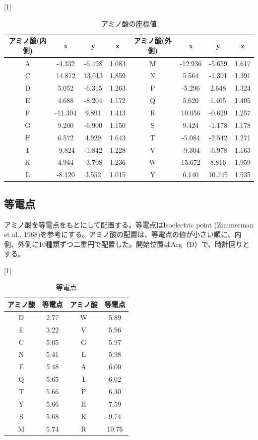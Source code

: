 \documentclass[a4paper,12pt]{jsreport}
\begin{document}
\begin{table}[H]
\centering
\caption{アミノ酸の座標値}
\scalebox{1}[1]{
\begin{tabular}{|cccc|cccc|} \hline
アミノ酸(内側) & x & y & z & アミノ酸(外側) & x & y & z \\ \hline
A & -4.332 & -6.498 & 1.083 & M & -12.936 & -5.659 & 1.617 \\[-2mm]
C & 14.872 & 13.013 & 1.859 & N & 5.564 & -1.391 & 1.391 \\[-2mm]
D & 5.052 & -6.315 & 1.263 & P & -5.296 & 2.648 & 1.324 \\[-2mm]
E & 4.688 & -8.204 & 1.172 & Q & 5.620 & 1.405 & 1.405 \\[-2mm]
F & -11.304 & 9.891 & 1.413 & R & 10.056 & -0.629 & 1.257 \\[-2mm]
G & 9.200 & -6.900 & 1.150 & S & 9.424 & -1.178 & 1.178 \\[-2mm]
H & 6.572 & 4.929 & 1.643 & T & -5.084 & -2.542 & 1.271 \\[-2mm]
I & -9.824 & -1.842 & 1.228 & V & -9.304 & -6.978 & 1.163 \\[-2mm]
K & 4.944 & -3.708 & 1.236 & W & 15.672 & 8.816 & 1.959 \\[-2mm]
L & -8.120 & 3.552 & 1.015 & Y & 6.140 & 10.745 & 1.535 \\ \hline
\end{tabular}
}
\end{table}


\subsection{等電点}
アミノ酸を等電点をもとにして配置する。等電点はIsoelectric point (Zimmerman et al., 1968)を参考にする。アミノ酸の配置は、等電点の値が小さい順に、内側、外側に10種類ずつ二重円で配置した。開始位置はArg（D）で、時計回りとする。

\begin{table}[H]
\centering
\caption{等電点}
\scalebox{1}[1]{
\begin{tabular}{|cc|cc|} \hline
アミノ酸 & 等電点 & アミノ酸 & 等電点 \\ \hline
D & 2.77 & W & 5.89 \\[-2mm]
E & 3.22 & V & 5.96 \\[-2mm]
C & 5.05 & G & 5.97 \\[-2mm]
N & 5.41 & L & 5.98 \\[-2mm]
F & 5.48 & A & 6.00 \\[-2mm]
Q & 5.65 & I & 6.02 \\[-2mm]
T & 5.66 & P & 6.30 \\[-2mm]
Y & 5.66 & H & 7.59 \\[-2mm]
S & 5.68 & K & 9.74 \\[-2mm]
M & 5.74 & R & 10.76 \\ \hline
\end{tabular}
}
\end{table}
\end{document}
